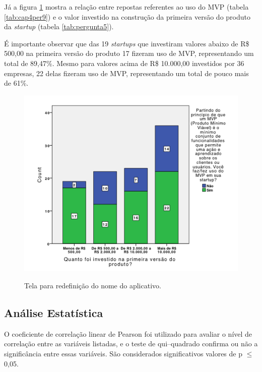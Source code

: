 \pagebreak

J\'a a figura \ref{fig:cap4fig2} mostra a rela\c{c}\~ao entre repostas referentes ao uso do MVP (tabela \ref{tab:cap4per9}) e o valor investido na constru\c{c}\~ao da primeira vers\~ao do produto da \emph{startup} (tabela \ref{tab:pergunta5}). 

\'E importante observar que das 19 \emph{startups} que investiram valores abaixo de R\$ 500,00 na primeira vers\~ao do produto 17 fizeram uso de MVP, representando um total de 89,47\%. Mesmo para valores acima de R\$ 10.000,00 investidos por 36 empresas, 22 delas fizeram uso de MVP, representando um total de pouco mais de 61\%.

\begin{figure}[h]
  \centering
  \caption{Tela para redefini\c{c}\~ao do nome do aplicativo.}
  \includegraphics[width=1.1\textwidth]{./fig/graph2}
  \label{fig:cap4fig2}
\end{figure}

\pagebreak

\subsection{An\'alise Estat\'istica}

O coeficiente de correla\c{c}\~ao linear de Pearson foi utilizado para avaliar o n\'ivel de correla\c{c}\~ao entre as vari\'aveis listadas, e o teste de qui--quadrado confirma ou n\~ao a signific\^ancia entre essas vari\'aveis. S\~ao considerados significativos valores de p $\leq$ 0,05.

